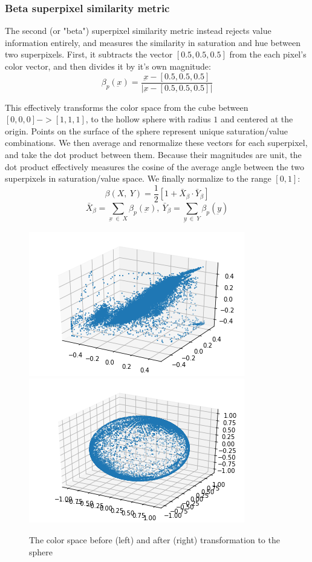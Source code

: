 \documentclass[twocolumn]{article}
\begin{document}
\subsubsection{Beta superpixel similarity metric}

The second (or "beta") superpixel similarity metric instead rejects value information entirely, and measures the similarity in saturation and hue between two superpixels. First, it subtracts the vector $[0.5, 0.5, 0.5]$ from the each pixel's color vector, and then divides it by it's own magnitude:
\[
    \beta_p(\underbar{x}) = \frac{\underbar{x} - [0.5, 0.5, 0.5]}{\lvert \underbar{x} - [0.5, 0.5, 0.5] \rvert}
\]

This effectively transforms the color space from the cube between $[0, 0, 0] -> [1, 1, 1]$, to the hollow sphere with radius $1$ and centered at the origin. Points on the surface of the sphere represent unique saturation/value combinations. We then average and renormalize these vectors for each superpixel, and take the dot product between them. Because their magnitudes are unit, the dot product effectively measures the cosine of the average angle between the two superpixels in saturation/value space. We finally normalize to the range $[0, 1]$:
\[
    \beta(X,\: Y) = \frac{1}{2}[1 + \bar{X}_\beta \cdot \bar{Y}_\beta]
\]
\[
    \bar{X}_\beta = \sum\limits_{\underbar{x}\: \in\: X} \beta_p(\underbar{x}),\ \bar{Y}_\beta = \sum\limits_{\underbar{y}\: \in\: Y} \beta_p(\underbar{y})
\]

\begin{figure}[h]
  \centering
  \includegraphics[width=0.45\linewidth]{figs/cloud.png}
  \includegraphics[width=0.45\linewidth]{figs/sphere.png}
  \caption{
    The color space before (left) and after (right) transformation to the sphere
  }
\end{figure}
\end{document}
